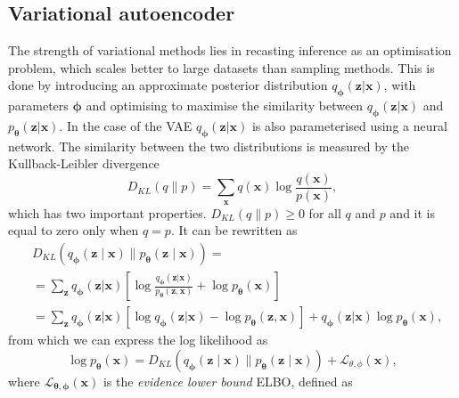 \subsection{Variational autoencoder}
\label{sec:ELBO}
The strength of variational methods lies in recasting inference as an optimisation problem, which scales better to large datasets than sampling methods. This is done by introducing an approximate posterior distribution $q_{\boldsymbol{\phi}}(\mathbf{z} | \mathbf{x})$, with parameters $\boldsymbol{\phi}$ and optimising to maximise the similarity between $q_{\boldsymbol{\phi}}(\mathbf{z} | \mathbf{x})$ and $p_{\boldsymbol{\theta}}(\mathbf{z} | \mathbf{x})$. In the case of the VAE $q_{\boldsymbol{\phi}}(\mathbf{z} | \mathbf{x})$ is also parameterised using a neural network. The similarity between the two distributions is measured by the Kullback-Leibler divergence 
\begin{equation}
	D_{KL}(q \| p)=\sum_{\mathbf{x}} q(\mathbf{x}) \log \frac{q(\mathbf{x})}{p(\mathbf{x})},
\end{equation}
which has two important properties. $D_{KL}(q \| p) \geq 0$ for all $q$ and $p$ and it is equal to zero only when $q = p$. It can be rewritten as
\begin{equation}
	\begin{aligned}
		&D_{K L}(q_{\boldsymbol{\phi}}(\mathbf{z} \mid \mathbf{x}) \| p_{\boldsymbol{\theta}}(\mathbf{z} \mid \mathbf{x})) = \\ 
		&= \sum_{\mathbf{z}} q_{\boldsymbol{\phi}}(\mathbf{z} | \mathbf{x})\left[\log \frac{q_{\boldsymbol{\phi}}(\mathbf{z} | \mathbf{x})}{p_{\boldsymbol{\theta}}(\mathbf{z}, \mathbf{x})}+\log p_{\boldsymbol{\theta}}(\mathbf{x})\right]  \\
		&= \sum_{\mathbf{z}} q_{\boldsymbol{\phi}}(\mathbf{z} | \mathbf{x})\left[\log q_{\boldsymbol{\phi}}(\mathbf{z} | \mathbf{x}) - \log p_{\boldsymbol{\theta}}(\mathbf{z}, \mathbf{x}) \right] + q_{\boldsymbol{\phi}}(\mathbf{z} | \mathbf{x}) \log p_{\boldsymbol{\theta}}(\mathbf{x}),
	\end{aligned}
\end{equation}
from which we can express the log likelihood as
\begin{equation}
	\label{eq:logpELBO}
	\log p_{\boldsymbol{\theta}}(\mathbf{x}) = D_{K L}(q_{\boldsymbol{\phi}}(\mathbf{z} \mid \mathbf{x}) \| p_{\boldsymbol{\theta}}(\mathbf{z} \mid \mathbf{x})) + \mathcal{L}_{\theta, \phi}(\mathbf{x}),
\end{equation}
where $\mathcal{L}_{\boldsymbol{\theta}, \boldsymbol{\phi}}(\mathbf{x})$ is the \emph{evidence lower bound} ELBO, defined as
